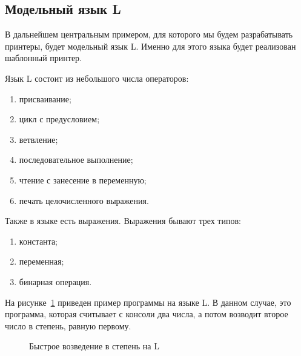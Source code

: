 \subsection{Модельный язык L}

В дальнейшем центральным примером, для которого мы будем разрабатывать принтеры, будет модельный язык L. Именно для этого языка будет реализован шаблонный принтер.

Язык L состоит из небольшого числа операторов:
\begin{enumerate}
	\item присваивание;
	\item цикл с предусловием;
	\item ветвление;
	\item последовательное выполнение;
	\item чтение с занесение в переменную;
	\item печать целочисленного выражения.
\end{enumerate}

Также в языке есть выражения. Выражения бывают трех типов:
\begin{enumerate}
	\item константа;
	\item переменная;
	\item бинарная операция.
\end{enumerate}

На рисунке~\ref{fig:lEx} приведен пример программы на языке L. В данном случае, это программа, которая считывает с консоли два числа, а потом возводит второе число в степень, равную первому.

\begin{figure}[h!]
	\centering
	
	\caption{Быстрое возведение в степень на L}
	\label{fig:lEx}
\end{figure}